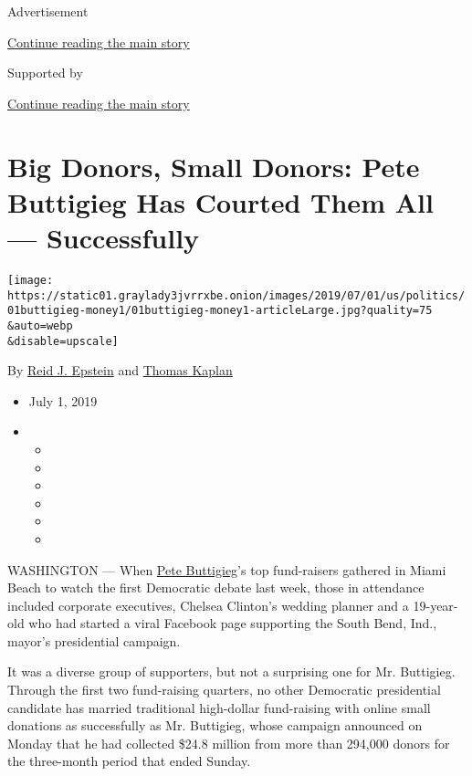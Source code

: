 Advertisement

\protect\hyperlink{after-top}{Continue reading the main story}

Supported by

\protect\hyperlink{after-sponsor}{Continue reading the main story}

\hypertarget{big-donors-small-donors-pete-buttigieg-has-courted-them-all--successfully}{%
\section{Big Donors, Small Donors: Pete Buttigieg Has Courted Them All
---
Successfully}\label{big-donors-small-donors-pete-buttigieg-has-courted-them-all--successfully}}

\texttt{[image: https://static01.graylady3jvrrxbe.onion/images/2019/07/01/us/politics/01buttigieg-money1/01buttigieg-money1-articleLarge.jpg?quality=75\\\&auto=webp\\\&disable=upscale]}

By \href{https://www.nytimes3xbfgragh.onion/by/reid-j-epstein}{Reid J.
Epstein} and
\href{https://www.nytimes3xbfgragh.onion/by/thomas-kaplan}{Thomas
Kaplan}

\begin{itemize}
\item
  July 1, 2019
\item
  \begin{itemize}
  \item
  \item
  \item
  \item
  \item
  \item
  \end{itemize}
\end{itemize}

WASHINGTON --- When
\href{https://www.nytimes3xbfgragh.onion/interactive/2020/us/elections/pete-buttigieg.html}{Pete
Buttigieg}'s top fund-raisers gathered in Miami Beach to watch the first
Democratic debate last week, those in attendance included corporate
executives, Chelsea Clinton's wedding planner and a 19-year-old who had
started a viral Facebook page supporting the South Bend, Ind., mayor's
presidential campaign.

It was a diverse group of supporters, but not a surprising one for Mr.
Buttigieg. Through the first two fund-raising quarters, no other
Democratic presidential candidate has married traditional high-dollar
fund-raising with online small donations as successfully as Mr.
Buttigieg, whose campaign announced on Monday that he had collected
\$24.8 million from more than 294,000 donors for the three-month period
that ended Sunday.

